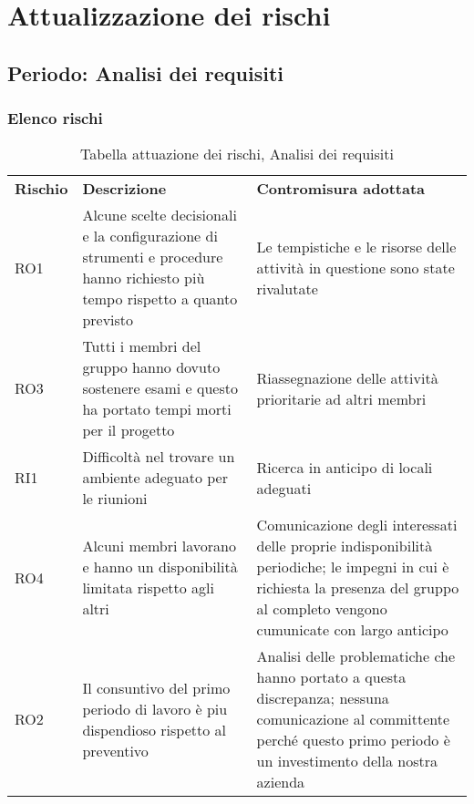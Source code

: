 \section{Attualizzazione dei rischi}
\subsection{Periodo: Analisi dei requisiti}
\subsubsection{Elenco rischi}
\begin{table}[h]
\caption{Tabella attuazione dei rischi, Analisi dei requisiti}
\begin{center}
\begin{tabular}{p{2cm}p{6cm}p{6cm}}
\textbf{Rischio} & \textbf{Descrizione}                                                                                                        & \textbf{Contromisura adottata}                                                                                                                                                   \\
RO1              & Alcune scelte decisionali e la configurazione di strumenti e procedure hanno richiesto più tempo rispetto a quanto previsto & Le tempistiche e le risorse delle attività in questione sono state rivalutate                                                                                                    \\
RO3              & Tutti i membri del gruppo hanno dovuto sostenere esami e questo ha portato tempi morti per il progetto                      & Riassegnazione delle attività prioritarie ad altri membri                                                                                                                        \\
RI1              & Difficoltà nel trovare un ambiente adeguato per le riunioni                                                                 & Ricerca in anticipo di locali adeguati                                                                                                                                           \\
RO4              & Alcuni membri lavorano e hanno un disponibilità limitata rispetto agli altri                                                & Comunicazione degli interessati delle proprie indisponibilità periodiche; le impegni in cui è richiesta la presenza del gruppo al completo vengono cumunicate con largo anticipo \\
RO2              & Il consuntivo del primo periodo di lavoro è piu dispendioso rispetto al preventivo                                          & Analisi delle problematiche che hanno portato a questa discrepanza; nessuna comunicazione al committente perché questo primo periodo è un investimento della nostra azienda     
\end{tabular}
\end{center}
\end{table}
